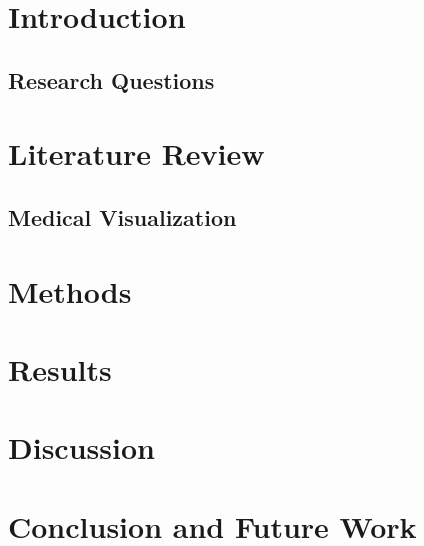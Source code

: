 \documentclass[acmlarge,screen]{acmart}
\begin{document}
%

%

%
\maketitle

\section{Introduction}


\subsection{Research Questions}


\section{Literature Review}


\subsection{Medical Visualization}

\section{Methods}


\section{Results}

\section{Discussion}

\section{Conclusion and Future Work}
\end{document}
